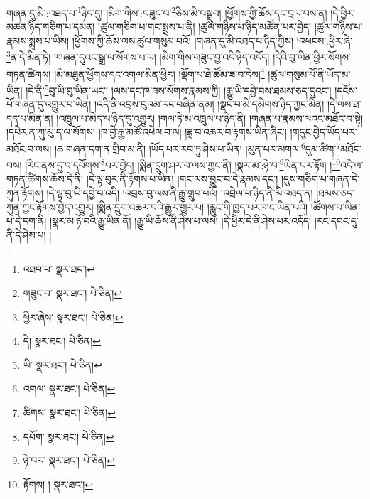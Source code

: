 གཞན་དུ་མི་:འཐད་པ་\footnote{འཐབ་པ་  སྣར་ཐང་། }ཉིད་དུ། །མིག་གིས་:བཟུང་བ་\footnote{གཟུང་བ་  སྣར་ཐང་།  པེ་ཅིན། }ཅིས་མི་བསྒྲུབ། །ཕྱོགས་ཀྱི་ཆོས་དང་བྲལ་བས་ན། །དེ་ཕྱིར་མཚན་ཉིད་གཅིག་པ་དམན། །ཚུལ་གཅིག་པ་གང་སྨྲས་པ་ནི། །ཚུལ་གཉིས་པ་ཉིད་མཚོན་པར་བྱེད། །ཚུལ་གཉིས་པ་རྣམས་སྨྲས་པ་ཡིས། །ཕྱོགས་ཀྱི་ཆོས་ལས་ཚུལ་གསུམ་པའོ། །གཞན་དུ་མི་འཐད་པ་ཉིད་ཀྱིས། །འཕངས་:ཕྱིར་ཞེ་\footnote{ཕྱིར་ཞེས་  སྣར་ཐང་།  པེ་ཅིན། }ན་དེ་མིན་ཏེ། །གཞན་དུའང་སྒྲ་ལ་སོགས་པ་ལ། །མིག་གིས་གཟུང་བྱ་འདི་ཉིད་འདོད། །དེའི་བུ་ཡིན་ཕྱིར་སོགས་གཏན་ཚིགས། །མི་མཐུན་ཕྱོགས་དང་འགལ་མིན་ཕྱིར། །ལྡོག་པ་ཐེ་ཚོམ་ཟ་བ་དེས།\footnote{དེ།  སྣར་ཐང་།  པེ་ཅིན། } །ཚུལ་གསུམ་པོ་ནི་ཡོད་མ་ཡིན། །དེ་ནི་\footnote{ཡི་  སྣར་ཐང་།  པེ་ཅིན། }བུ་ཡི་བུ་ཡིན་ཡང་། །ལས་དང་ཁ་ཟས་སོགས་རྣམས་ཀྱི། །རྒྱུ་ཡི་དབྱེ་བས་ཐམས་ཅད་དུའང་། །དངོས་པོ་གཞན་དུ་འགྱུར་བ་ཡིན། །འདི་ནི་འབྲས་བུའམ་རང་བཞིན་ནམ། །སྣང་བ་མི་དམིགས་ཉིད་ཀྱང་མིན། །དེ་ལས་ཐ་དད་པ་མིན་ན། །འཁྲུལ་པ་མེད་པ་ཉིད་དུ་འགྱུར། །གལ་ཏེ་མ་འཁྲུལ་པ་ཉིད་ནི། །གཞན་པ་རྣམས་ལའང་མཐོང་བ་སྟེ། །དཔེར་ན་ཀུ་མུ་ད་ལ་སོགས། །ཁ་བྱེ་རྒྱ་མཚོ་འཕེལ་བ་ལ། །ཟླ་བ་འཆར་བ་རྟགས་ཡིན་ཞིང་། །གདུང་བྱེད་ཡོད་པར་མཐོང་བ་ལས། །ཆ་གཞན་དག་ན་གྲིབ་མ་ནི། །ཡོད་པར་རབ་ཏུ་ཤེས་པ་ཡིན། །མུན་པར་མགལ་\footnote{འགལ་  སྣར་ཐང་།  པེ་ཅིན། }དུམ་ཚིག་\footnote{ཚིགས་  སྣར་ཐང་།  པེ་ཅིན། }མཐོང་བས། །རིང་ནས་དུ་བ་དཔོགས་\footnote{དཔོག་  སྣར་ཐང་།  པེ་ཅིན། }པར་བྱེད། །སྨིན་དྲུག་ཤར་བ་ལས་ཀྱང་ནི། །སྣར་མ་:ཉེ་བ་\footnote{ཉེ་བར་  སྣར་ཐང་།  པེ་ཅིན། }ཡིན་པར་རྟོག །\footnote{རྟོགས། །  སྣར་ཐང་། }འདི་ལ་གཏན་ཚིགས་ཆོས་དེ་ནི། །དེ་ལྟ་བུར་ནི་རྟོགས་པ་ཡིན། །གང་ལས་བྱུང་བ་དེ་རྣམས་དང་། །དུས་གཅིག་པ་གཞན་དེ་ཀུན་རྟོགས། །དེ་ལྟ་བུ་ཡི་དབྱེ་བ་འདི། །འབྲས་བུ་ལས་ནི་རྒྱུ་གྲུབ་པའོ། །འབྲེལ་པ་ཉིད་ནི་མི་འཐད་ན། །ཐམས་ཅད་ཀུན་ཀྱང་རྟོགས་བྱེད་འགྱུར། །སྨིན་དྲུག་འཆར་བའི་རྒྱུར་གྱུར་པ། །རླུང་གི་ཁྱད་པར་གང་ཡིན་པའི། །ཚོགས་པ་ཡིན་པ་དེ་དག་ནི། །སྣར་མ་ཉེ་བའི་རྒྱུ་ཡིན་ནོ། །རྒྱུ་ཡི་ཆོས་ནི་ཤེས་པ་ལས། །དེ་ཕྱིར་དེ་ནི་ཤེས་པར་འདོད། །རང་དབང་དུ་ནི་དེ་ཤེས་པ། །
